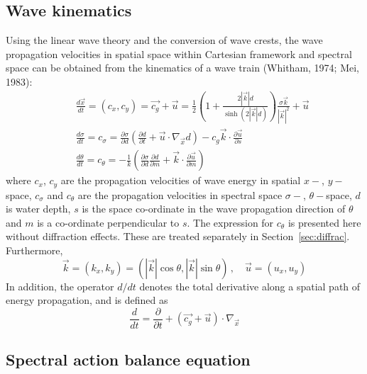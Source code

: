 \documentclass[12pt]{book}
\begin{document}
\subsection{Wave kinematics}
Using the linear wave theory and the conversion of wave crests, the wave propagation velocities in spatial space within
Cartesian framework and spectral space can be obtained from the kinematics of a wave train (Whitham, 1974; Mei, 1983):
\begin{eqnarray}
  &&\frac{d\vec{x}}{dt} = (c_x,c_y) = \vec{c_g} + \vec{u} = \frac{1}{2} \left ( 1 +
    \frac{2|\vec{k}|d}{\sinh (2|\vec{k}|d)}\right )
    \frac{\sigma \vec{k}}{{|\vec{k}|}^2} + \vec{u} \\ \nonumber
  &&\frac{d\sigma}{dt} = c_\sigma = \frac{\partial \sigma}{\partial d}
    \left ( \frac{\partial d}{\partial t} + \vec{u} \cdot \nabla_{\vec{x}} d\right )
    -c_g \vec{k} \cdot \frac{\partial \vec{u}}{\partial s} \\
  &&\frac{d\theta}{dt} = c_\theta = -\frac{1}{k} \left ( \frac{\partial \sigma}{\partial d}\frac{\partial d}{\partial m}
    + \vec{k} \cdot \frac{\partial \vec{u}}{\partial m} \right ) \nonumber
  \label{intro9}
\end{eqnarray}
where $c_x$, $c_y$ are the propagation velocities of wave energy in spatial $x-$, $y-$space, $c_\sigma$ and $c_\theta$
are the propagation velocities in spectral space $\sigma-$, $\theta-$space, $d$ is water depth, $s$ is the space co-ordinate
in the wave propagation direction of $\theta$ and $m$ is a co-ordinate perpendicular to $s$.
The expression for $c_\theta$ is presented here without diffraction effects. These are treated separately in Section~\ref{sec:diffrac}.
\\[2ex]
\noindent
Furthermore,
\begin{equation}
  \vec{k} = (k_x,k_y) = (|\vec{k}|\cos \theta, |\vec{k}|\sin \theta) \, , \quad \vec{u} = (u_x,u_y)
  \label{intro10}
\end{equation}
In addition, the operator $d/dt$ denotes the total derivative along a spatial path of energy propagation, and is defined as
\begin{equation}
  \frac{d}{dt} = \frac{\partial}{\partial t} + (\vec{c_g} + \vec{u}) \cdot \nabla_{\vec{x}}
\end{equation}

\subsection{Spectral action balance equation} \label{sec:actbaleq}
\end{document}
